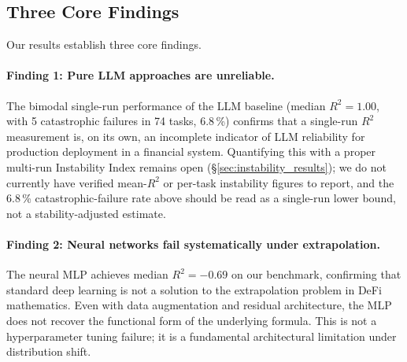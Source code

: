 \documentclass[twoside,11pt]{article}
\newcommand{\Rsq}{R^{2}}
\begin{document}
\subsection{Three Core Findings}\label{subsec:three-core-findings}
\label{sec:disc_findings}

Our results establish three core findings.

\paragraph{Finding 1: Pure LLM approaches are unreliable.}
The bimodal single-run performance of the LLM baseline (median $\Rsq=1.00$,
with 5 catastrophic failures in 74 tasks, 6.8\,\%) confirms that a single-run
$\Rsq$ measurement is, on its own, an incomplete indicator of LLM reliability
for production deployment in a financial system. Quantifying this with a
proper multi-run Instability Index remains open (\S\ref{sec:instability_results});
we do not currently have verified mean-$\Rsq$ or per-task instability figures
to report, and the 6.8\,\% catastrophic-failure rate above should be read as a
single-run lower bound, not a stability-adjusted estimate.

\paragraph{Finding 2: Neural networks fail systematically under extrapolation.}
The neural MLP achieves median $\Rsq=-0.69$ on our benchmark, confirming that
standard deep learning is not a solution to the extrapolation problem in DeFi
mathematics.  Even with data augmentation and residual architecture, the MLP does
not recover the functional form of the underlying formula.  This is not a
hyperparameter tuning failure; it is a fundamental architectural limitation under
distribution shift.
\end{document}
